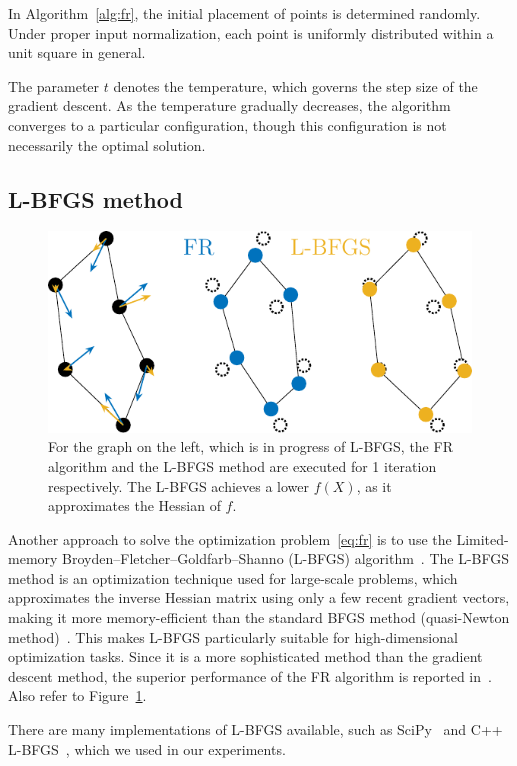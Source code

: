 \documentclass[dvipdfmx,lettersize,journal]{IEEEtran}
\begin{document}
In Algorithm~\ref{alg:fr}, the initial placement of points is determined randomly. Under proper input normalization, each point is uniformly distributed within a unit square in general.

The parameter $t$ denotes the temperature, which governs the step size of the gradient descent. As the temperature gradually decreases, the algorithm converges to a particular configuration, though this configuration is not necessarily the optimal solution.

\subsection{L-BFGS method}\label{ssec:lbfgs}

\begin{figure}[t]
  \centering
  \includegraphics[width=0.804\columnwidth]{comparison_FRandLBFGS.pdf}
  \caption{
    For the graph on the left, which is in progress of L-BFGS, the FR algorithm and the L-BFGS method are executed for 1 iteration respectively.
    The L-BFGS achieves a lower $f(X)$, as it approximates the Hessian of $f$.
  }
  \label{fig:comparisonFRandLBFGS}
\end{figure}

Another approach to solve the optimization problem~\eqref{eq:fr} is to use the Limited-memory Broyden--Fletcher--Goldfarb--Shanno (L-BFGS) algorithm~\cite{6183577}.
The L-BFGS method is an optimization technique used for large-scale problems, which approximates the inverse Hessian matrix using only a few recent gradient vectors, making it more memory-efficient than the standard BFGS method (quasi-Newton method)~\cite{liuLimitedMemoryBFGS1989}.
This makes L-BFGS particularly suitable for high-dimensional optimization tasks. Since it is a more sophisticated method than the gradient descent method, the superior performance of the FR algorithm is reported in~\cite{6183577}. Also refer to Figure~\ref{fig:comparisonFRandLBFGS}.

There are many implementations of L-BFGS available, such as SciPy~\cite{2020SciPy-NMeth} and C++ L-BFGS~\cite{qiuYixuanLBFGSpp2024,okazakiChokkanLiblbfgs2024}, which we used in our experiments.
\end{document}
